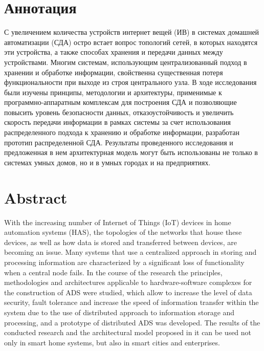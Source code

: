 \documentclass[a4paper,12pt]{article}
\begin{document}



\section*{Аннотация}

С увеличением количества устройств интернет вещей (ИВ) в системах домашней автоматизации (СДА) остро встает вопрос топологий сетей, в которых находятся эти устройства, а также способах хранения и передачи данных между устройствами. Многим системам, использующим централизованный подход в хранении и обработке информации, свойственна существенная потеря функциональности при выходе из строя центрального узла. В ходе исследования были изучены принципы, методологии и архитектуры, применимые к программно-аппаратным комплексам для построения СДА и позволяющие повысить уровень безопасности данных, отказоустойчивость и увеличить скорость передачи информации в рамках системы за счет использования распределенного подхода к хранению и обработке информации, разработан прототип распределенной СДА. Результаты проведенного исследования и предложенная в нем архитектурная модель могут быть использованы не только в системах умных домов, но и в умных городах и на предприятиях.

\section*{Abstract}

With the increasing number of Internet of Things (IoT) devices in home automation systems (HAS), the topologies of the networks that house these devices, as well as how data is stored and transferred between devices, are becoming an issue. Many systems that use a centralized approach in storing and processing information are characterized by a significant loss of functionality when a central node fails. In the course of the research the principles, methodologies and architectures applicable to hardware-software complexes for the construction of ADS were studied, which allow to increase the level of data security, fault tolerance and increase the speed of information transfer within the system due to the use of distributed approach to information storage and processing, and a prototype of distributed ADS was developed. The results of the conducted research and the architectural model proposed in it can be used not only in smart home systems, but also in smart cities and enterprises.

\newpage
\end{document}
